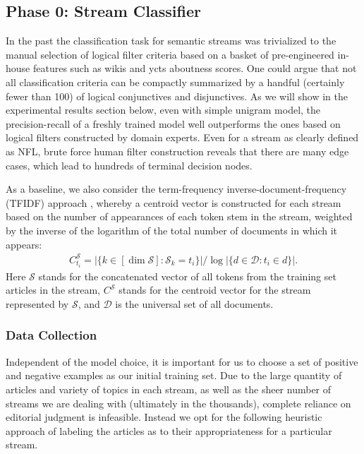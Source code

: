 \documentclass{sig-alternate}
\newcommand{\card}[1]{|#1|}
\begin{document}
\subsection{Phase 0: Stream Classifier}
\label{sec:stream classifier}

In the past the classification task for semantic streams was trivialized to 
the manual selection of logical filter criteria based on a basket of 
pre-engineered in-house features such as wikis and ycts aboutness scores. One 
could argue that not 
all classification criteria can be compactly summarized by a handful 
(certainly fewer than 100) of logical conjunctives and disjunctives. 
As we 
will show in the experimental results section below, even with simple 
unigram model, the precision-recall of a freshly trained model well 
outperforms the ones based on logical filters constructed by domain experts. 
Even for a stream as clearly defined as NFL, brute force human filter 
construction reveals that there are many edge cases, which lead to hundreds of 
terminal decision nodes. 

  As a baseline, we also consider the term-frequency 
  inverse-document-frequency (TFIDF) approach \cite{tfidf}, whereby a centroid 
  vector is constructed for each stream based on the number of appearances of 
  each token stem in the stream, weighted by the inverse of the logarithm of 
  the total number of documents in which it appears:
\begin{align*}
C^{\mathcal{S}}_{t_i} =\card{\{k \in [\dim \mathcal{S}]: \mathcal{S}_k = t_i  \}} / \log \card{\{d \in \mathcal{D}: t_i \in d\}}.
\end{align*}
Here $\mathcal{S}$ stands for the concatenated vector of all tokens from the training set articles in the stream, $C^{\mathcal{S}}$ stands for the centroid vector for the stream represented by $\mathcal{S}$, and $\mathcal{D}$ is the universal set of all documents.


\subsubsection{Data Collection}
  Independent of the model choice, it is important for us to choose a set of 
  positive and negative examples as our initial training set. Due to the large 
  quantity of articles and variety of topics in each stream, as well as the 
  sheer number of streams we are dealing with (ultimately in the thousands), 
  complete reliance on editorial judgment is infeasible. Instead we 
  opt for the following heuristic approach of labeling the articles as to 
  their appropriateness for a particular stream. 
\end{document}
